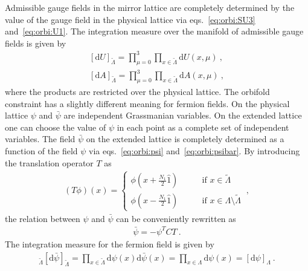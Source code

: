 \documentclass[11pt,fleqn]{article}
\renewcommand{\d}{\mathrm{d}}
\begin{document}
Admissible gauge fields in the mirror lattice are completely determined by the value of the gauge field in the physical lattice via eqs.~\eqref{eq:orbi:SU3} and~\eqref{eq:orbi:U1}. The integration measure over the manifold of admissible gauge fields is given by
\begin{subequations}
   \label{eq:meas:gauge}
   \begin{gather}
      [ \d U ]_{\tilde{\Lambda}} = \prod_{\mu=0}^3 \prod_{x \in \tilde{\Lambda}} \d U(x,\mu) \ ,
      \label{eq:meas:SU3} \\
      [ \d A ]_{\tilde{\Lambda}} = \prod_{\mu=0}^3 \prod_{x \in \tilde{\Lambda}} \d A(x,\mu) \ ,
      \label{eq:meas:U1}
   \end{gather}
\end{subequations}
where the products are restricted over the physical lattice. The orbifold constraint has a slightly different meaning for fermion fields. On the physical lattice $\psi$ and $\bar{\psi}$ are independent Grassmanian variables. On the extended lattice one can choose the value of $\psi$ in each point as a complete set of independent variables. The field $\bar{\psi}$ on the extended lattice is completely determined as a function of the field $\psi$ via eqs.~\eqref{eq:orbi:psi} and~\eqref{eq:orbi:psibar}. By introducing the translation operator $T$ as
\begin{gather}
   (T \phi)(x) =
   \begin{cases}
      \phi(x + \tfrac{N_1}{2} \hat{1})  \qquad & \text{if } x \in \tilde{\Lambda} \\
      \phi(x - \tfrac{N_1}{2} \hat{1})  \qquad & \text{if } x \in \Lambda \setminus \tilde{\Lambda}
   \end{cases}
   \ ,
\end{gather}
the relation between $\psi$ and $\bar{\psi}$ can be conveniently rewritten as
\begin{gather}
   \bar{\psi} = - \psi^T C T \ .
   \label{eq:majorana}
\end{gather}
The integration measure for the fermion field is given by
\begin{gather}
   [ \d \psi ]_{\tilde{\Lambda}} [ \d \bar{\psi} ]_{\tilde{\Lambda}}
   =
   \prod_{x \in \tilde{\Lambda}} \d \psi(x) \d \bar{\psi}(x)
   =
   \prod_{x \in \Lambda} \d \psi(x)
   =
   [ \d \psi ]_\Lambda
   \ .
   \label{eq:meas:fermion}
\end{gather}
\end{document}
